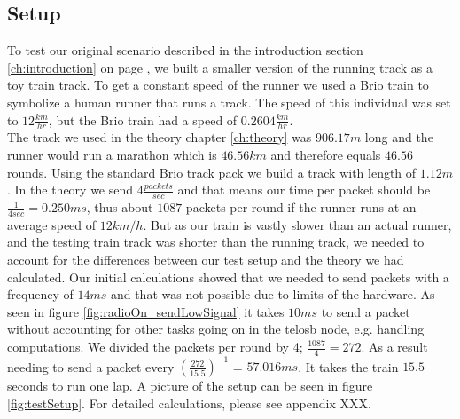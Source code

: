 \subsection{Setup}\label{sc:setup}

To test our original scenario described in the introduction section \ref{ch:introduction} on page \pageref{ch:introduction}, we built a smaller version of the running track as a toy train track. To get a constant speed of the runner we used a Brio train to symbolize a human runner that runs a track. The speed of this individual was set to $12\frac{km}{hr}$, but the Brio train had a speed of $0.2604\frac{km}{hr}$. \\

\noindent The track we used in the theory chapter \ref{ch:theory} was $906.17m$ long and the runner would run a marathon which is $46.56km$ and therefore equals $46.56$ rounds. Using the standard Brio track pack we build a track with length of $1.12m$. In the theory we send $4\frac{packets}{sec}$ and that means our time per packet should be $\frac{1}{4sec} = 0.250ms$, thus about $1087$ packets per round if the runner runs at an average speed of $12km/h$. But as our train is vastly slower than an actual runner, and the testing train track was shorter than the running track, we needed to account for the differences between our test setup and the theory we had calculated. Our initial calculations showed that we needed to send packets with a frequency of $14ms$ and that was not possible due to limits of the hardware. As seen in figure \ref{fig:radioOn_sendLowSignal} it takes $10ms$ to send a packet without accounting for other tasks going on in the telosb node, e.g. handling computations. We divided the packets per round by 4; $\frac{1087}{4} = 272$. As a result needing to send a packet every $(\frac{272}{15.5})^{-1}$ = $57.016 ms$. It takes the train $15.5$ seconds to run one lap. A picture of the setup can be seen in figure \ref{fig:testSetup}. For detailed calculations, please see appendix XXX.
